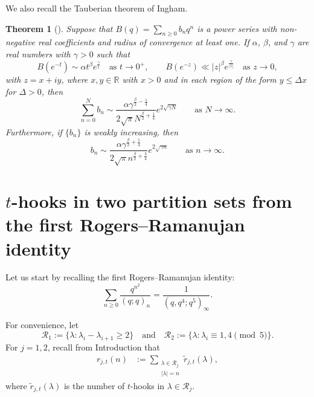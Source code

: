 \documentclass[11pt,reqno]{amsart}
\newtheorem{theorem}{Theorem}[section]
\theoremstyle{remark}
\numberwithin{equation}{section}
\begin{document}
We also recall the Tauberian theorem of Ingham.
\begin{theorem}[{\cite[Theorem 1.1]{BJM}}]\label{Tauberian}
	Suppose that $B(q)=\sum_{n \geq 0} b_n q^n$ is a power series with non-negative real coefficients and radius of convergence at least one. If $\alpha$, $\beta$, and $\gamma$ are real numbers with $\gamma > 0$ such that
	\[
		B\left(e^{-t}\right) \sim \alpha t^{\beta} e^{\frac{\gamma}{t}} \quad \text{as } t \to 0^+, \qquad B\left(e^{-z}\right) \ll |z|^{\beta} e^{\frac{\gamma}{|z|}} \quad \text{as } z \to 0,
	\]	
	with $z=x+iy$, where $x, y \in \mathbb{R}$ with $x>0$ and in each region of the form $y \leq \Delta x$ for $\Delta>0$, then
	\[
		\sum_{n=0}^N b_n \sim \frac{\alpha \gamma^{\frac{\beta}{2}-\frac14}}{2 \sqrt{\pi} N^{\frac{\beta}{2}+\frac14}} e^{2\sqrt{\gamma N}} \qquad \text{as } N \to \infty.
	\]
	Furthermore, if $\{b_n\}$ is weakly increasing, then
	\[
		b_n \sim \frac{\alpha \gamma^{\frac{\beta}{2}+\frac14}}{2 \sqrt{\pi} n^{\frac{\beta}{2}+\frac34}} e^{2\sqrt{\gamma n}} \qquad \text{as } n \to \infty.
	\] 
\end{theorem}


\section{$t$-hooks in two partition sets from the first Rogers--Ramanujan identity}\label{sec3}

Let us start by recalling the first Rogers--Ramanujan identity:
\[
	\sum_{n\ge 0} \frac{ q^{n^2}}{(q;q)_n} =\frac{1}{(q,q^4;q^{5})_{\infty}}.
\]

For convenience, let
\[
	\mathcal{R}_1:=\{\lambda : \lambda_{i}-\lambda_{i+1} \ge 2 \} \quad \text{and} \quad
	\mathcal{R}_2:=\{\lambda : \lambda_{i}\equiv 1,4 \pmod{5}\}.
\]
For $j=1,2$, recall from Introduction that
\begin{align*}
	r_{j,t}(n)&:=\sum\limits_{\substack{\lambda \in \mathcal{R}_j \\ |\lambda|=n}} \widetilde{r}_{j,t} (\lambda),
\end{align*}
where $\widetilde{r}_{j, t} (\lambda)$ is the number of $t$-hooks in $\lambda \in \mathcal{R}_j$.
\end{document}
